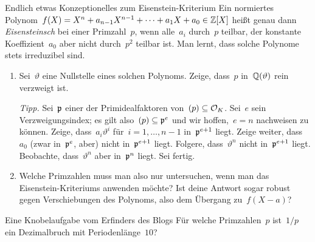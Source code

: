 \documentclass{uebblatt}
\begin{document}
\begin{aufgabe}{Endlich etwas Konzeptionelles zum Eisenstein-Kriterium}
Ein normiertes Polynom~$f(X) = X^n + a_{n-1}X^{n-1} + \cdots + a_1X + a_0 \in \mathbb{Z}[X]$
heißt genau dann \emph{Eisensteinsch} bei einer Primzahl~$p$, wenn alle~$a_i$
durch~$p$ teilbar, der konstante Koeffizient~$a_0$ aber nicht durch~$p^2$ teilbar ist.
Man lernt, dass solche Polynome stets irreduzibel sind.
\begin{enumerate}
\item Sei~$\vartheta$ eine Nullstelle eines solchen Polynoms. Zeige, dass~$p$
in~$\mathbb{Q}(\vartheta)$ rein verzweigt ist.

{\tiny\emph{Tipp.} Sei~$\mathfrak{p}$ einer der Primidealfaktoren von~$(p) \subseteq
\mathcal{O}_K$. Sei~$e$ sein Verzweigungsindex; es gilt also~$(p) \subseteq \mathfrak{p}^e$ und
wir hoffen,~$e = n$ nachweisen zu können. Zeige, dass~$a_i \vartheta^i$ für~$i
= 1,\ldots,n-1$ in~$\mathfrak{p}^{e+1}$ liegt. Zeige weiter, dass~$a_0$ (zwar
in~$\mathfrak{p}^e$, aber) nicht in~$\mathfrak{p}^{e+1}$ liegt. Folgere, dass~$\vartheta^n$
nicht in~$\mathfrak{p}^{e+1}$ liegt. Beobachte, dass~$\vartheta^n$ aber in~$\mathfrak{p}^n$
liegt. Sei fertig.\par}

\item Welche Primzahlen muss man also nur untersuchen, wenn man das
Eisenstein-Kriteriums anwenden möchte? Ist deine Antwort
sogar robust gegen Verschiebungen des Polynoms, also dem Übergang zu~$f(X-a)$?
\end{enumerate}
\end{aufgabe}

\begin{aufgabe*}{Eine Knobelaufgabe vom Erfinders des Blogs}
Für welche Primzahlen~$p$ ist~$1/p$ ein Dezimalbruch mit Periodenlänge~$10$?
\end{aufgabe*}
\end{document}
